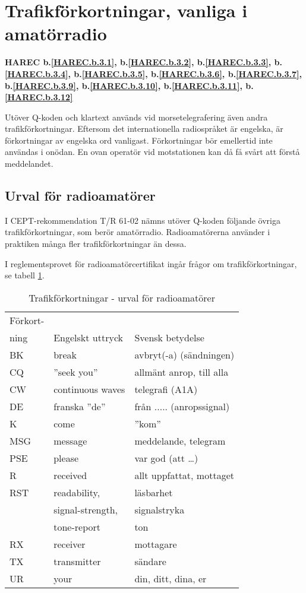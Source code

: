 \section{Trafikförkortningar, vanliga i amatörradio}
\textbf{
HAREC b.\ref{HAREC.b.3.1}\label{myHAREC.b.3.1},
 b.\ref{HAREC.b.3.2}\label{myHAREC.b.3.2},
 b.\ref{HAREC.b.3.3}\label{myHAREC.b.3.3},
 b.\ref{HAREC.b.3.4}\label{myHAREC.b.3.4},
 b.\ref{HAREC.b.3.5}\label{myHAREC.b.3.5},
 b.\ref{HAREC.b.3.6}\label{myHAREC.b.3.6},
 b.\ref{HAREC.b.3.7}\label{myHAREC.b.3.7},
 b.\ref{HAREC.b.3.9}\label{myHAREC.b.3.9},
 b.\ref{HAREC.b.3.10}\label{myHAREC.b.3.10},
 b.\ref{HAREC.b.3.11}\label{myHAREC.b.3.11},
 b.\ref{HAREC.b.3.12}\label{myHAREC.b.3.12}
}

Utöver Q-koden och klartext används vid morsetelegrafering även andra
trafikförkortningar. Eftersom det internationella radiospråket är
engelska, är förkortningar av engelska ord vanligast.  Förkortningar
bör emellertid inte användas i onödan. En ovan operatör vid
motstationen kan då få svårt att förstå meddelandet.

\subsection{Urval för radioamatörer}

I CEPT-rekommendation T/R 61-02 nämns utöver Q-koden följande övriga
trafikförkortningar, som berör amatörradio.  Radioamatörerna använder
i praktiken många fler trafikförkortningar än dessa.

I reglementsprovet för radioamatörcertifikat ingår frågor om
trafikförkortningar, se tabell \ref{tab:trafikförkortningar}.

\begin{table}
  \label{tab:trafikförkortningar}
  \caption{Trafikförkortningar - urval för radioamatörer}
  \begin{tabular}{lll}
    Förkort- & & \\
    ning & Engelskt uttryck & Svensk betydelse \\
    \hline
    BK & break & avbryt(-a) (sändningen) \\
    CQ & ''seek you'' & allmänt anrop, till alla \\
    CW & continuous waves & telegrafi (A1A) \\
    DE & franska ''de'' & från ..... (anropssignal) \\
    K  & come & ''kom'' \\
    MSG & message & meddelande, telegram \\
    PSE & please & var god (att \dots) \\
    R & received & allt uppfattat, mottaget \\
   RST & readability, & läsbarhet \\
   & signal-strength, & signalstryka \\
   & tone-report & ton \\
    RX & receiver & mottagare \\
    TX & transmitter & sändare \\
    UR & your & din, ditt, dina, er \\
  \end{tabular}
\end{table}

